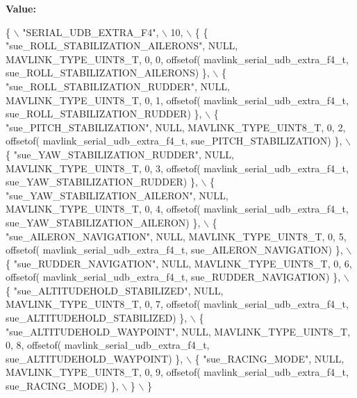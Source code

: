 {\bfseries Value\+:}
\begin{DoxyCode}
\{ \(\backslash\)
    \textcolor{stringliteral}{"SERIAL\_UDB\_EXTRA\_F4"}, \(\backslash\)
    10, \(\backslash\)
    \{  \{ \textcolor{stringliteral}{"sue\_ROLL\_STABILIZATION\_AILERONS"}, NULL, MAVLINK_TYPE_UINT8_T, 0, 0, offsetof(
      mavlink_serial_udb_extra_f4_t, sue\_ROLL\_STABILIZATION\_AILERONS) \}, \(\backslash\)
         \{ \textcolor{stringliteral}{"sue\_ROLL\_STABILIZATION\_RUDDER"}, NULL, MAVLINK_TYPE_UINT8_T, 0, 1, offsetof(
      mavlink_serial_udb_extra_f4_t, sue\_ROLL\_STABILIZATION\_RUDDER) \}, \(\backslash\)
         \{ \textcolor{stringliteral}{"sue\_PITCH\_STABILIZATION"}, NULL, MAVLINK_TYPE_UINT8_T, 0, 2, offsetof(
      mavlink_serial_udb_extra_f4_t, sue\_PITCH\_STABILIZATION) \}, \(\backslash\)
         \{ \textcolor{stringliteral}{"sue\_YAW\_STABILIZATION\_RUDDER"}, NULL, MAVLINK_TYPE_UINT8_T, 0, 3, offsetof(
      mavlink_serial_udb_extra_f4_t, sue\_YAW\_STABILIZATION\_RUDDER) \}, \(\backslash\)
         \{ \textcolor{stringliteral}{"sue\_YAW\_STABILIZATION\_AILERON"}, NULL, MAVLINK_TYPE_UINT8_T, 0, 4, offsetof(
      mavlink_serial_udb_extra_f4_t, sue\_YAW\_STABILIZATION\_AILERON) \}, \(\backslash\)
         \{ \textcolor{stringliteral}{"sue\_AILERON\_NAVIGATION"}, NULL, MAVLINK_TYPE_UINT8_T, 0, 5, offsetof(
      mavlink_serial_udb_extra_f4_t, sue\_AILERON\_NAVIGATION) \}, \(\backslash\)
         \{ \textcolor{stringliteral}{"sue\_RUDDER\_NAVIGATION"}, NULL, MAVLINK_TYPE_UINT8_T, 0, 6, offsetof(
      mavlink_serial_udb_extra_f4_t, sue\_RUDDER\_NAVIGATION) \}, \(\backslash\)
         \{ \textcolor{stringliteral}{"sue\_ALTITUDEHOLD\_STABILIZED"}, NULL, MAVLINK_TYPE_UINT8_T, 0, 7, offsetof(
      mavlink_serial_udb_extra_f4_t, sue\_ALTITUDEHOLD\_STABILIZED) \}, \(\backslash\)
         \{ \textcolor{stringliteral}{"sue\_ALTITUDEHOLD\_WAYPOINT"}, NULL, MAVLINK_TYPE_UINT8_T, 0, 8, offsetof(
      mavlink_serial_udb_extra_f4_t, sue\_ALTITUDEHOLD\_WAYPOINT) \}, \(\backslash\)
         \{ \textcolor{stringliteral}{"sue\_RACING\_MODE"}, NULL, MAVLINK_TYPE_UINT8_T, 0, 9, offsetof(
      mavlink_serial_udb_extra_f4_t, sue\_RACING\_MODE) \}, \(\backslash\)
         \} \(\backslash\)
\}
\end{DoxyCode}
\mbox{\label{mavlink__msg__serial__udb__extra__f4_8h_a712d81727fb74b8ed8aea10b6ad29100}} 
